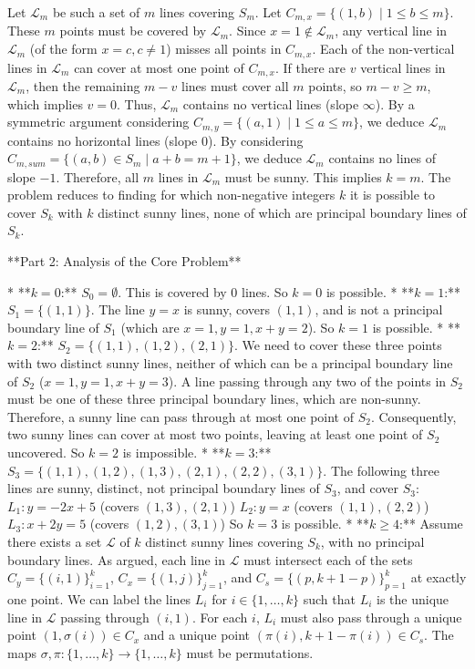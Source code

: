 \documentclass[12pt]{article}
\begin{document}
Let $\mathcal{L}_m$ be such a set of $m$ lines covering $S_m$.
Let $C_{m,x} = \{(1,b) \mid 1 \le b \le m\}$. These $m$ points must be covered by $\mathcal{L}_m$. Since $x=1 \notin \mathcal{L}_m$, any vertical line in $\mathcal{L}_m$ (of the form $x=c, c \ne 1$) misses all points in $C_{m,x}$. Each of the non-vertical lines in $\mathcal{L}_m$ can cover at most one point of $C_{m,x}$. If there are $v$ vertical lines in $\mathcal{L}_m$, then the remaining $m-v$ lines must cover all $m$ points, so $m-v \ge m$, which implies $v=0$. Thus, $\mathcal{L}_m$ contains no vertical lines (slope $\infty$).
By a symmetric argument considering $C_{m,y} = \{(a,1) \mid 1 \le a \le m\}$, we deduce $\mathcal{L}_m$ contains no horizontal lines (slope $0$).
By considering $C_{m,sum} = \{(a,b) \in S_m \mid a+b=m+1\}$, we deduce $\mathcal{L}_m$ contains no lines of slope $-1$.
Therefore, all $m$ lines in $\mathcal{L}_m$ must be sunny. This implies $k=m$. The problem reduces to finding for which non-negative integers $k$ it is possible to cover $S_k$ with $k$ distinct sunny lines, none of which are principal boundary lines of $S_k$.

**Part 2: Analysis of the Core Problem**

*   **$k=0$:** $S_0 = \emptyset$. This is covered by 0 lines. So $k=0$ is possible.
*   **$k=1$:** $S_1 = \{(1,1)\}$. The line $y=x$ is sunny, covers $(1,1)$, and is not a principal boundary line of $S_1$ (which are $x=1, y=1, x+y=2$). So $k=1$ is possible.
*   **$k=2$:** $S_2 = \{(1,1), (1,2), (2,1)\}$. We need to cover these three points with two distinct sunny lines, neither of which can be a principal boundary line of $S_2$ ($x=1, y=1, x+y=3$). A line passing through any two of the points in $S_2$ must be one of these three principal boundary lines, which are non-sunny. Therefore, a sunny line can pass through at most one point of $S_2$. Consequently, two sunny lines can cover at most two points, leaving at least one point of $S_2$ uncovered. So $k=2$ is impossible.
*   **$k=3$:** $S_3 = \{(1,1), (1,2), (1,3), (2,1), (2,2), (3,1)\}$. The following three lines are sunny, distinct, not principal boundary lines of $S_3$, and cover $S_3$:
    $L_1: y = -2x+5$ (covers $(1,3), (2,1)$)
    $L_2: y = x$ (covers $(1,1), (2,2)$)
    $L_3: x+2y=5$ (covers $(1,2), (3,1)$)
    So $k=3$ is possible.
*   **$k \ge 4$:** Assume there exists a set $\mathcal{L}$ of $k$ distinct sunny lines covering $S_k$, with no principal boundary lines. As argued, each line in $\mathcal{L}$ must intersect each of the sets $C_y=\{(i,1)\}_{i=1}^k$, $C_x=\{(1,j)\}_{j=1}^k$, and $C_s=\{(p,k+1-p)\}_{p=1}^k$ at exactly one point.
    We can label the lines $L_i$ for $i \in \{1, \dots, k\}$ such that $L_i$ is the unique line in $\mathcal{L}$ passing through $(i,1)$. For each $i$, $L_i$ must also pass through a unique point $(1, \sigma(i)) \in C_x$ and a unique point $(\pi(i), k+1-\pi(i)) \in C_s$. The maps $\sigma, \pi: \{1, \dots, k\} \to \{1, \dots, k\}$ must be permutations.
\end{document}
